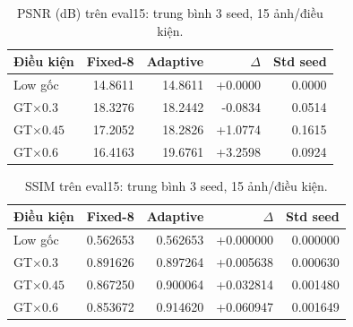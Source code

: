 \begin{table}[H]\centering\small
\caption{PSNR (dB) trên eval15: trung bình 3 seed, 15 ảnh/điều kiện.}
\begin{tabular}{lrrrr}\toprule
Điều kiện & Fixed-8 & Adaptive & $\Delta$ & Std seed\\\midrule
Low gốc & 14.8611 & 14.8611 & +0.0000 & 0.0000\\
GT$\times0.3$ & 18.3276 & 18.2442 & -0.0834 & 0.0514\\
GT$\times0.45$ & 17.2052 & 18.2826 & +1.0774 & 0.1615\\
GT$\times0.6$ & 16.4163 & 19.6761 & +3.2598 & 0.0924\\
\bottomrule\end{tabular}
\end{table}
\begin{table}[H]\centering\small
\caption{SSIM trên eval15: trung bình 3 seed, 15 ảnh/điều kiện.}
\begin{tabular}{lrrrr}\toprule
Điều kiện & Fixed-8 & Adaptive & $\Delta$ & Std seed\\\midrule
Low gốc & 0.562653 & 0.562653 & +0.000000 & 0.000000\\
GT$\times0.3$ & 0.891626 & 0.897264 & +0.005638 & 0.000630\\
GT$\times0.45$ & 0.867250 & 0.900064 & +0.032814 & 0.001480\\
GT$\times0.6$ & 0.853672 & 0.914620 & +0.060947 & 0.001649\\
\bottomrule\end{tabular}
\end{table}
